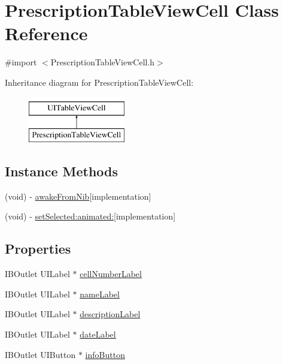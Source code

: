 \hypertarget{interface_prescription_table_view_cell}{}\section{Prescription\+Table\+View\+Cell Class Reference}
\label{interface_prescription_table_view_cell}


{\ttfamily \#import $<$Prescription\+Table\+View\+Cell.\+h$>$}

Inheritance diagram for Prescription\+Table\+View\+Cell\+:\begin{figure}[H]
\begin{center}
\leavevmode
\includegraphics[height=2.000000cm]{interface_prescription_table_view_cell}
\end{center}
\end{figure}
\subsection*{Instance Methods}
\begin{DoxyCompactItemize}
\item 
(void) -\/ \hyperlink{interface_prescription_table_view_cell_a2f2e9dc42b9b68c6be5cd939adf024ab}{awake\+From\+Nib}{\ttfamily  \mbox{[}implementation\mbox{]}}
\item 
(void) -\/ \hyperlink{interface_prescription_table_view_cell_ad83348b956ab0b42be897ffc36fd1da8}{set\+Selected\+:animated\+:}{\ttfamily  \mbox{[}implementation\mbox{]}}
\end{DoxyCompactItemize}
\subsection*{Properties}
\begin{DoxyCompactItemize}
\item 
I\+B\+Outlet U\+I\+Label $\ast$ \hyperlink{interface_prescription_table_view_cell_abfb41b91eb16794fcd809c5f2432ad96}{cell\+Number\+Label}
\item 
I\+B\+Outlet U\+I\+Label $\ast$ \hyperlink{interface_prescription_table_view_cell_a31cf8f092908312c5043e380af795446}{name\+Label}
\item 
I\+B\+Outlet U\+I\+Label $\ast$ \hyperlink{interface_prescription_table_view_cell_a22ccf6666725558cfcbd547d0b69e207}{description\+Label}
\item 
I\+B\+Outlet U\+I\+Label $\ast$ \hyperlink{interface_prescription_table_view_cell_a535c9e8ed07e6eb626be7c79ee6dc40a}{date\+Label}
\item 
I\+B\+Outlet U\+I\+Button $\ast$ \hyperlink{interface_prescription_table_view_cell_a32c7bc9e2a399eff60e3f12b89563852}{info\+Button}
\end{DoxyCompactItemize}


